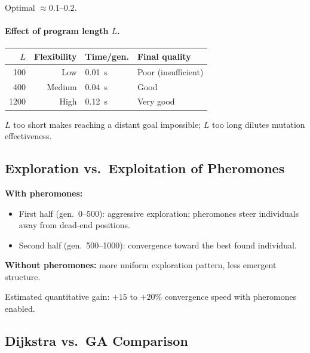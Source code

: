 \documentclass[12pt, a4paper]{article}
\theoremstyle{definition}
\begin{document}
Optimal $\approx 0.1$--$0.2$.

\paragraph{Effect of program length $L$.}

\begin{center}
\begin{tabular}{rrll}
    \toprule
    $L$ & Flexibility & Time/gen. & Final quality \\
    \midrule
    100  & Low    & 0.01~s & Poor (insufficient) \\
    400  & Medium & 0.04~s & Good \\
    1200 & High   & 0.12~s & Very good \\
    \bottomrule
\end{tabular}
\end{center}

$L$ too short makes reaching a distant goal impossible; $L$ too long dilutes
mutation effectiveness.

\subsection{Exploration vs.\ Exploitation of Pheromones}

\textbf{With pheromones:}
\begin{itemize}[noitemsep]
    \item First half (gen.\ 0--500): aggressive exploration; pheromones steer
          individuals away from dead-end positions.
    \item Second half (gen.\ 500--1000): convergence toward the best found individual.
\end{itemize}

\textbf{Without pheromones:} more uniform exploration pattern, less emergent structure.

Estimated quantitative gain: $+15$ to $+20\%$ convergence speed with pheromones
enabled.

\subsection{Dijkstra vs.\ GA Comparison}
\end{document}
